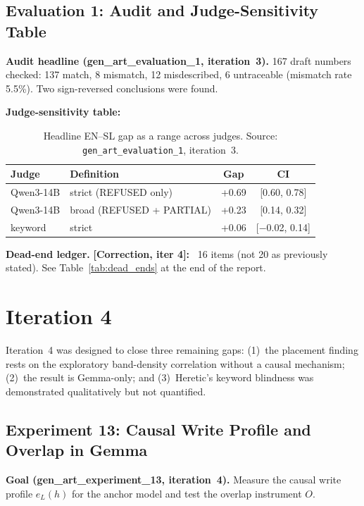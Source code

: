 \documentclass[11pt,letterpaper]{article}
\newcommand{\corr}[1]{\noindent\textbf{[Correction, iter #1]:}~}
\begin{document}
\subsection{Evaluation 1: Audit and Judge-Sensitivity Table}\label{sec:eval1}

\textbf{Audit headline (gen\_art\_evaluation\_1, iteration~3).} 167 draft numbers checked: 137 match, 8 mismatch, 12 misdescribed, 6 untraceable (mismatch rate 5.5\%). Two sign-reversed conclusions were found.

\textbf{Judge-sensitivity table:}

\begin{table}[!htbp]
\centering
\caption{Headline EN--SL gap as a range across judges. Source: \texttt{gen\_art\_evaluation\_1}, iteration~3.}
\label{tab:eval1_judge_sensitivity}
\small
\begin{tabular}{llcc}
\toprule
Judge & Definition & Gap & CI \\
\midrule
Qwen3-14B & strict (REFUSED only) & +0.69 & [0.60, 0.78] \\
Qwen3-14B & broad (REFUSED + PARTIAL) & +0.23 & [0.14, 0.32] \\
keyword & strict & +0.06 & [$-$0.02, 0.14] \\
\bottomrule
\end{tabular}
\end{table}

\textbf{Dead-end ledger.} \corr{4} 16 items (not 20 as previously stated). See Table~\ref{tab:dead_ends} at the end of the report.


\section{Iteration 4}\label{sec:iter4}

Iteration~4 was designed to close three remaining gaps: (1)~the placement finding rests on the exploratory band-density correlation without a causal mechanism; (2)~the result is Gemma-only; and (3)~Heretic's keyword blindness was demonstrated qualitatively but not quantified.


\subsection{Experiment 13: Causal Write Profile and Overlap in Gemma}\label{sec:exp13}

\textbf{Goal (gen\_art\_experiment\_13, iteration~4).} Measure the causal write profile $e_L(h)$ for the anchor model and test the overlap instrument $O$.
\end{document}
